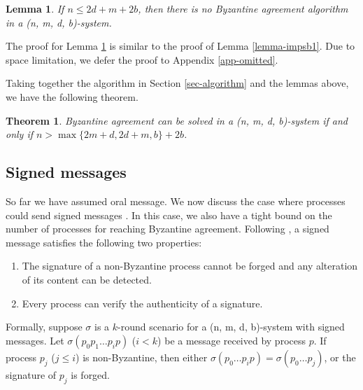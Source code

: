 \documentclass[11pt,conference,compsoc,onecolumn,romanappendices]{IEEEtran}
\newtheorem{lemma}{Lemma}
\newtheorem{theorem}{Theorem}
\begin{document}
\begin{lemma}\label{lemma-impsb2}
  If $n \leqslant 2 d + m + 2 b$, then there is no Byzantine
  agreement algorithm in a (n, m, d, b)-system.
\end{lemma}

The proof for Lemma \ref{lemma-impsb2} is similar to the proof of Lemma \ref{lemma-impsb1}.
Due to space limitation, we defer the proof to Appendix \ref{app-omitted}.

Taking together the algorithm in Section \ref{sec-algorithm} and the lemmas above, 
we have the following theorem.

\begin{theorem}\label{thm-bound}
  Byzantine agreement can be solved in a (n, m, d, b)-system if and only if $n > \max \{2 m + d, 2 d + m, b\}+ 2
  b$.
\end{theorem}

\subsection*{Signed messages}\label{sec-signed}

So far we have assumed oral message.
We now discuss the case where processes could send signed messages {\cite{lamport1982byzantine}}. 
In this case, we also have a tight bound on the number of processes
for reaching Byzantine agreement.
Following {\cite{lamport1982byzantine}}, a signed message satisfies the
following two properties:
\begin{enumerate}
\itemsep0em
  \item The signature of a non-Byzantine process cannot be forged and any alteration of
  its content can be detected.
  
  \item Every process can verify the authenticity of a signature.
\end{enumerate}

Formally, suppose $\sigma$ is a $k$-round scenario for a (n, m, d, b)-system
with signed messages. Let $\sigma (p_0 p_1 \ldots p_i p)$ ($i < k$) be a
message received by process $p$. If process $p_j$ ($j \leqslant i$) is
non-Byzantine, then either $\sigma (p_0 \ldots p_i p) = \sigma (p_0 \ldots p_j)$, or the signature of $p_j$ is forged.
\end{document}
